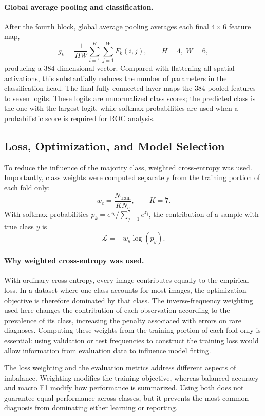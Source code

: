 \documentclass[11pt,a4paper]{article}
\begin{document}
\paragraph{Global average pooling and classification.}
After the fourth block, global average pooling averages each final $4\times6$ feature map,
\[
g_k=\frac{1}{HW}\sum_{i=1}^{H}\sum_{j=1}^{W}F_k(i,j),\qquad H=4,\;W=6,
\]
producing a $384$-dimensional vector. Compared with flattening all spatial activations, this substantially reduces the number of parameters in the classification head. The final fully connected layer maps the $384$ pooled features to seven logits. These logits are unnormalized class scores; the predicted class is the one with the largest logit, while softmax probabilities are used when a probabilistic score is required for ROC analysis.

\subsection{Loss, Optimization, and Model Selection}
To reduce the influence of the majority class, weighted cross-entropy was used. Importantly, class weights were computed separately from the training portion of each fold only:
\[
w_c=\frac{N_{\mathrm{train}}}{K N_c},\qquad K=7.
\]
With softmax probabilities $p_k=e^{z_k}/\sum_{j=1}^{7}e^{z_j}$, the contribution of a sample with true class $y$ is
\[
\mathcal{L}=-w_y\log(p_y).
\]


\paragraph{Why weighted cross-entropy was used.}
With ordinary cross-entropy, every image contributes equally to the empirical loss. In a dataset where one class accounts for most images, the optimization objective is therefore dominated by that class. The inverse-frequency weighting used here changes the contribution of each observation according to the prevalence of its class, increasing the penalty associated with errors on rare diagnoses. Computing these weights from the training portion of each fold only is essential: using validation or test frequencies to construct the training loss would allow information from evaluation data to influence model fitting.

The loss weighting and the evaluation metrics address different aspects of imbalance. Weighting modifies the training objective, whereas balanced accuracy and macro F1 modify how performance is summarized. Using both does not guarantee equal performance across classes, but it prevents the most common diagnosis from dominating either learning or reporting.
\end{document}
